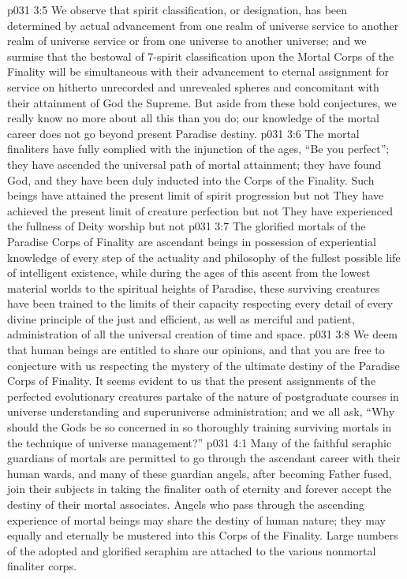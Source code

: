 \vs p031 3:5 We observe that spirit classification, or designation, has been determined by actual advancement from one realm of universe service to another realm of universe service or from one universe to another universe; and we surmise that the bestowal of 7\hyp{}spirit classification upon the Mortal Corps of the Finality will be simultaneous with their advancement to eternal assignment for service on hitherto unrecorded and unrevealed spheres and concomitant with their attainment of God the Supreme. But aside from these bold conjectures, we really know no more about all this than you do; our knowledge of the mortal career does not go beyond present Paradise destiny.
\vs p031 3:6 \bibnobreakspace The mortal finaliters have fully complied with the injunction of the ages, “Be you perfect”; they have ascended the universal path of mortal attainment; they have found God, and they have been duly inducted into the Corps of the Finality. Such beings have attained the present limit of spirit progression but not  They have achieved the present limit of creature perfection but not  They have experienced the fullness of Deity worship but not 
\vs p031 3:7 \bibnobreakspace The glorified mortals of the Paradise Corps of Finality are ascendant beings in possession of experiential knowledge of every step of the actuality and philosophy of the fullest possible life of intelligent existence, while during the ages of this ascent from the lowest material worlds to the spiritual heights of Paradise, these surviving creatures have been trained to the limits of their capacity respecting every detail of every divine principle of the just and efficient, as well as merciful and patient, administration of all the universal creation of time and space.
\vs p031 3:8 \pc We deem that human beings are entitled to share our opinions, and that you are free to conjecture with us respecting the mystery of the ultimate destiny of the Paradise Corps of Finality. It seems evident to us that the present assignments of the perfected evolutionary creatures partake of the nature of postgraduate courses in universe understanding and superuniverse administration; and we all ask, “Why should the Gods be so concerned in so thoroughly training surviving mortals in the technique of universe management?”
\vs p031 4:1 Many of the faithful seraphic guardians of mortals are permitted to go through the ascendant career with their human wards, and many of these guardian angels, after becoming Father fused, join their subjects in taking the finaliter oath of eternity and forever accept the destiny of their mortal associates. Angels who pass through the ascending experience of mortal beings may share the destiny of human nature; they may equally and eternally be mustered into this Corps of the Finality. Large numbers of the adopted and glorified seraphim are attached to the various nonmortal finaliter corps.
